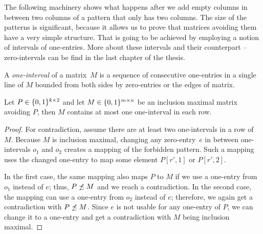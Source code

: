 The following machinery shows what happens after we add empty columns in between two columns of a pattern that only has two columns. The size of the patterns is significant, because it allows us to prove that matrices avoiding them have a very simple structure. That is going to be achieved by employing a notion of intervals of one-entries. More about these intervals and their counterpart -- zero-intervals can be find in the last chapter of the thesis.

\begin{defn}
A \emph{one-interval} of a matrix~$M$ is a sequence of consecutive one-entries in a single line of $M$ bounded from both sides by zero-entries or the edges of matrix.
\end{defn}

\begin{lemma}
\label{lemma:twocols}
Let $P\in\{0,1\}^{k\times2}$ and let $M\in\{0,1\}^{m\times n}$ be an inclusion maximal matrix avoiding $P$, then $M$ contains at most one one-interval in each row.
\end{lemma}
\begin{proof}
For contradiction, assume there are at least two one-intervals in a row of $M$. Because $M$ is inclusion maximal, changing any zero-entry~$e$ in between one-intervals $o_1$ and $o_2$ creates a mapping of the forbidden pattern. Such a mapping uses the changed one-entry to map some element $P[r',1]$ or $P[r',2]$.

In the first case, the same mapping also maps $P$ to $M$ if we use a one-entry from $o_1$ instead of $e$; thus, $P\not\preceq M$ and we reach a contradiction. In the second case, the mapping can use a one-entry from $o_2$ instead of $e$; therefore, we again get a contradiction with $P\not\preceq M$. Since $e$ is not usable for any one-entry of $P$, we can change it to a one-entry and get a contradiction with $M$ being inclusion maximal.
\end{proof}

